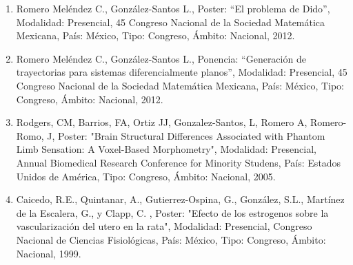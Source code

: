 \begin{enumerate}
\item  Romero Meléndez C., González-Santos L., Poster: “El problema de Dido”, Modalidad: Presencial, 45 Congreso Nacional de 
la 
Sociedad Matemática Mexicana, País: México, Tipo: Congreso, Ámbito: Nacional, 2012.

\item  Romero Meléndez C., González-Santos L., Ponencia: “Generación de trayectorias para sistemas diferencialmente planos”, 
Modalidad: Presencial, 45 Congreso Nacional de la Sociedad Matemática Mexicana, País: México, Tipo: Congreso, Ámbito: 
Nacional, 2012.

\item  Rodgers, CM, Barrios, FA, Ortiz JJ, Gonzalez-Santos, L, Romero A, Romero-Romo, J, Poster: "Brain Structural 
Differences 
Associated with Phantom Limb Sensation: A Voxel-Based Morphometry", Modalidad: Presencial, Annual Biomedical Research 
Conference for Minority Studens, País: Estados Unidos de América, Tipo: Congreso, Ámbito: Nacional, 2005.

\item  Caicedo, R.E., Quintanar, A., Gutierrez-Ospina, G., González, S.L., Martínez de la Escalera, G., y Clapp, C. , Poster: 
"Efecto de los estrogenos sobre la vascularización del utero en la rata", Modalidad: Presencial, Congreso Nacional de 
Ciencias Fisiológicas, País: México, Tipo: Congreso, Ámbito: Nacional, 1999.

\end{enumerate}


